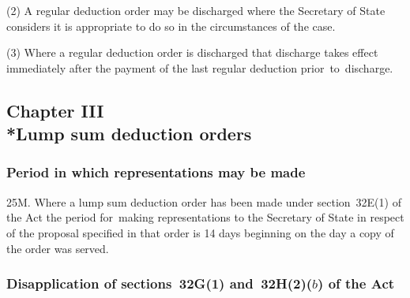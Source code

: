 \documentclass[12pt,a4paper]{article}
\begin{document}
(2) A regular deduction order may be discharged where the 
Secretary of State  %
considers it is appropriate to do so in the circumstances of the case.

(3) Where a regular deduction order is discharged that discharge takes effect immediately after the payment of the last regular deduction prior~to~discharge.


\subsection[Chapter III --- Lump sum deduction orders]{Chapter III\\*Lump sum deduction orders}

\renewcommand\parthead{--- Part IIIA Chapter III}

\subsubsection[25M. Period in which representations may be made]{Period in which representations may be made}

25M.  Where a lump sum deduction order has been made under section~32E(1) of the Act the period for~making representations to the 
Secretary of State  %
in respect of the proposal specified in that order is 14 days beginning on the day a copy of the order was served.


\subsubsection[25N. Disapplication of sections~32G(1) and~32H(2)($b$)  of the Act]{Disapplication of sections~32G(1) and~32H(2)($b$)  of the Act}
\end{document}
